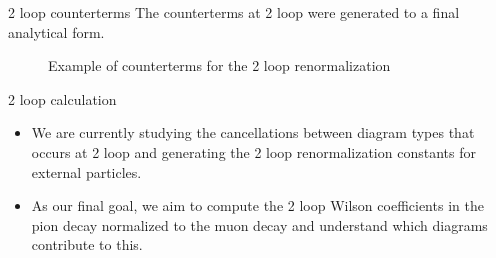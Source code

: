 \documentclass[11pt]{beamer}
\begin{document}
\begin{frame}{2 loop counterterms}
    The counterterms at 2 loop were generated to a final analytical form. 

\begin{figure}[h]
\centering
{}
\caption{Example of counterterms for the 2 loop renormalization}
\end{figure}
\end{frame}

\begin{frame}{2 loop calculation}
\begin{itemize}
    \item We are currently studying the cancellations between diagram types that occurs at 2 loop and generating the 2 loop renormalization constants for external particles.

   \item As our final goal, we aim to compute the 2 loop Wilson coefficients in the pion decay normalized to the muon decay and understand which diagrams contribute to this.
\end{itemize}
\end{frame}
\end{document}

